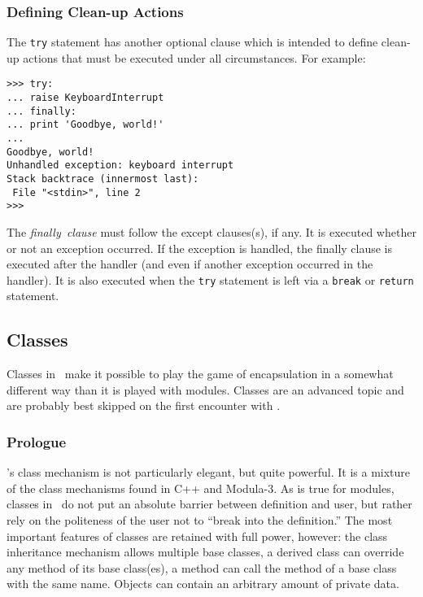 \subsubsection{Defining Clean-up Actions}

The {\tt try} statement has another optional clause which is intended to
define clean-up actions that must be executed under all circumstances.
For example:
\bcode\begin{verbatim}
>>> try:
... raise KeyboardInterrupt
... finally:
... print 'Goodbye, world!'
...
Goodbye, world!
Unhandled exception: keyboard interrupt
Stack backtrace (innermost last):
 File "<stdin>", line 2
>>>
\end{verbatim}\ecode
The
{\em finally\ clause}
must follow the except clauses(s), if any.
It is executed whether or not an exception occurred.
If the exception is handled, the finally clause is executed after the
handler (and even if another exception occurred in the handler).
It is also executed when the {\tt try} statement is left via a
{\tt break} or {\tt return} statement.

\subsection{Classes}

Classes in \Python\ make it possible to play the game of encapsulation in a
somewhat different way than it is played with modules.
Classes are an advanced topic and are probably best skipped on the first
encounter with \Python.

\subsubsection{Prologue}

\Python's class mechanism is not particularly elegant, but quite powerful.
It is a mixture of the class mechanisms found in C++ and Modula-3.
As is true for modules, classes in \Python\ do not put an absolute barrier
between definition and user, but rather rely on the politeness of the
user not to ``break into the definition.''
The most important features of classes are retained with full power,
however: the class inheritance mechanism allows multiple base classes,
a derived class can override any method of its base class(es), a method
can call the method of a base class with the same name.
Objects can contain an arbitrary amount of private data.


